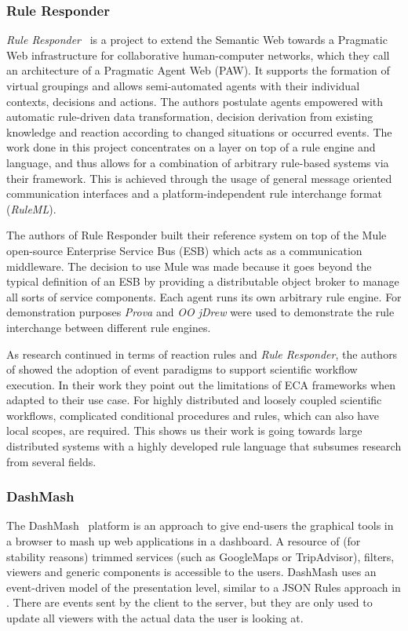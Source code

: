 \documentclass[11pt]{article}%
\begin{document}
\subsubsection{Rule Responder}
\emph{Rule Responder}~\cite{2007-Paschke_etal-RuleResponder.pdf} is a project to extend the Semantic Web towards a Pragmatic Web infrastructure for collaborative human-computer networks, which they call an architecture of a Pragmatic Agent Web (PAW). It supports the formation of virtual groupings and allows semi-automated agents with their individual contexts, decisions and actions. The authors postulate agents empowered with automatic rule-driven data transformation, decision derivation from existing knowledge and reaction according to changed situations or occurred events. The work done in this project concentrates on a layer on top of a rule engine and language, and thus allows for a combination of arbitrary rule-based systems via their framework. This is achieved through the usage of general message oriented communication interfaces and a platform-independent rule interchange format (\emph{RuleML}).

The authors of Rule Responder built their reference system\cite{wwwruleresponder} on top of the Mule~\cite{wwwmuleesb} open-source Enterprise Service Bus (ESB) which acts as a communication middleware. The decision to use Mule was made because it goes beyond the typical definition of an ESB by providing a distributable object broker to manage all sorts of service components. Each agent runs its own arbitrary rule engine. For demonstration purposes \emph{Prova} and \emph{OO jDrew} were used to demonstrate the rule interchange between different rule engines.

As research continued in terms of reaction rules and \textit{Rule Responder}, the authors of \cite{2013_Zhao-Paschke_EDSWE.pdf} showed the adoption of event paradigms to support scientific workflow execution. In their work they point out the limitations of ECA frameworks when adapted to their use case. For highly distributed and loosely coupled scientific workflows, complicated conditional procedures and rules, which can also have local scopes, are required. This shows us their work is going towards large distributed systems with a highly developed rule language that subsumes research from several fields.

\subsubsection{DashMash}
The DashMash~\cite{2011-Cappiello_etal-DashMash.pdf} platform is an approach to give end-users the graphical tools in a browser to mash up web applications in a dashboard. A resource of (for stability reasons) trimmed services (such as GoogleMaps or TripAdvisor), filters, viewers and generic components is accessible to the users. DashMash uses an event-driven model of the presentation level, similar to a JSON Rules approach in \cite{2009-Pascalau_Giurca-RBACEM.pdf}. There are events sent by the client to the server, but they are only used to update all viewers with the actual data the user is looking at.
\end{document}
